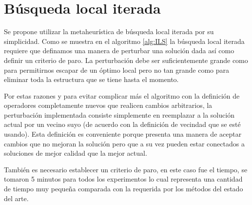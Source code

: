 \section{Búsqueda local iterada}
Se propone utilizar la metaheurística de búsqueda local iterada por su simplicidad. Como se muestra en el algoritmo \ref{alg:ILS} la búsqueda local iterada requiere que definamos una manera de perturbar una solución dada así como definir un criterio de paro. La perturbación debe ser suficientemente grande como para permitirnos escapar de un óptimo local pero no tan grande como para eliminar toda la estructura que se tiene hasta el momento.

Por estas razones y para evitar complicar más el algoritmo con la definición de operadores completamente nuevos que realicen cambios arbitrarios, la perturbación implementada consiste simplemente en reemplazar a la solución actual por un vecino suyo (de acuerdo con la definición de vecindad que se esté usando). Esta definición es conveniente porque presenta una manera de aceptar cambios que no mejoran la solución pero que a su vez pueden estar conectados a soluciones de mejor calidad que la mejor actual.

 También es necesario establecer un criterio de paro, en este caso fue el tiempo, se tomaron 5 minutos para todos los experimentos lo cual representa una cantidad de tiempo muy pequeña comparada con la requerida por los métodos del estado del arte.


